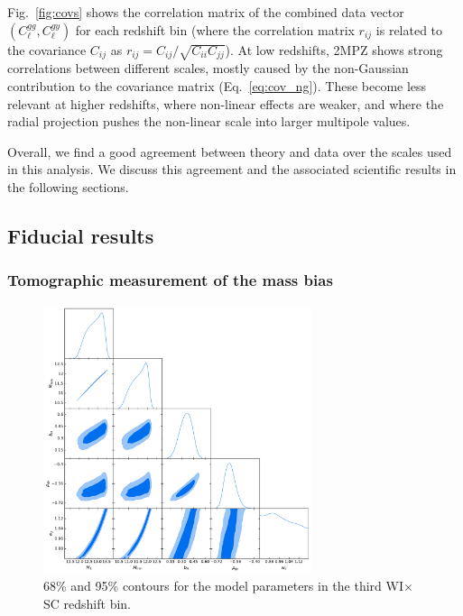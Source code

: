 \documentclass[useAMS,usenatbib]{mn2e}
\begin{document}
    Fig.\!~\ref{fig:covs} shows the correlation matrix of the combined data vector $(C^{gg}_\ell,C^{gy}_\ell)$ for each redshift bin (where the correlation matrix $r_{ij}$ is related to the covariance $C_{ij}$ as $r_{ij}=C_{ij}/\sqrt{C_{ii}C_{jj}}$). At low redshifts, 2MPZ shows strong correlations between different scales, mostly caused by the non-Gaussian contribution to the covariance matrix (Eq.\!~\ref{eq:cov_ng}). These become less relevant at higher redshifts, where non-linear effects are weaker, and where the radial projection pushes the non-linear scale into larger multipole values.
    
    Overall, we find a good agreement between theory and data over the scales used in this analysis. We discuss this agreement and the associated scientific results in the following sections.

  \subsection{Fiducial results}\label{ssec:results.fid}  
    
    \subsubsection{Tomographic measurement of the mass bias}\label{ssec:results.fid.1mb}

      \begin{figure}
        \centering
        \includegraphics[width=0.7\textwidth]{fiducial_wisc3.pdf}
        \caption{68\% and 95\% contours for the model parameters in the third WI$\times$SC redshift bin.}
        \label{fig:triangle}
      \end{figure}
\end{document}
